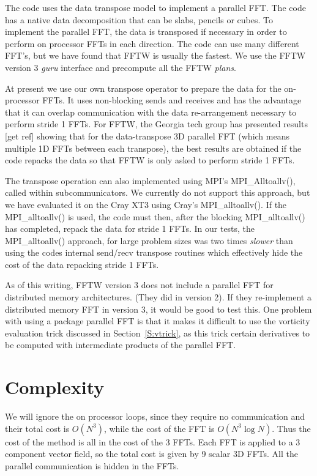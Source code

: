 \documentclass[12pt]{article}
\begin{document}
The code uses the data transpose model to implement a parallel FFT.
The code has a native data decomposition that can be slabs, pencils
or cubes.  To implement the parallel FFT, the data is transposed if 
necessary in order to perform on processor FFTs in each direction.
The code can use many different FFT's, but we have found that 
FFTW is usually the fastest.  We use the FFTW version 3 {\em guru} interface
and precompute all the FFTW {\em plans}.

At present we use our own transpose operator to prepare the data for
the on-processor FFTs.  It uses non-blocking sends and receives and
has the advantage that it can overlap communication with the data
re-arrangement necessary to perform stride 1 FFTs.  For FFTW, the
Georgia tech group has presented results [get ref] showing that for
the data-transpose 3D parallel FFT (which means multiple 1D FFTs
between each transpose), the best results are obtained if the code
repacks the data so that FFTW is only asked to perform stride 1 FFTs.

The transpose operation can also implemented using MPI's
MPI\_Alltoallv(), called within subcommunicators.  
We currently do not support this approach, but we have evaluated
it on the Cray XT3 using Cray's MPI\_alltoallv().  
If the MPI\_alltoallv() is used, the code must then, 
after the blocking MPI\_alltoallv() has completed,
repack the data for stride 1 FFTs.  In our tests, the
MPI\_alltoallv() approach, for large problem sizes was 
two times {\em slower} than using the codes internal send/recv
transpose routines which effectively hide the cost of the
data repacking stride 1 FFTs.

As of this writing, FFTW version 3 does not include
a parallel FFT for distributed memory architectures.
(They did in version 2).  If they re-implement a distributed
memory FFT in version 3, it would be good to test this.  
One problem with using a package parallel FFT is that it
makes it difficult to use the vorticity evaluation trick discussed in 
Section~\ref{S:vtrick}, as this trick certain derivatives
to be computed with intermediate products of the parallel FFT.



\section{Complexity}

We will ignore the on processor loops, since they require no
communication and their total cost is $O(N^3)$, while the cost of the
FFT is $O(N^3 \log N)$.   Thus the cost of the method is all in
the cost of the 3 FFTs.  Each FFT is applied to a 3 component
vector field, so the total cost is given by 9 scalar 3D FFTs.  
All the parallel communication is hidden in the FFTs. 
\end{document}
